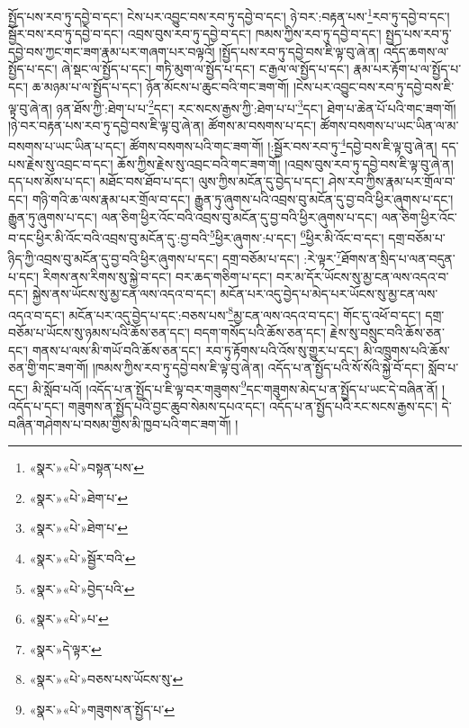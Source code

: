 སྤྱོད་པས་རབ་ཏུ་དབྱེ་བ་དང་། ངེས་པར་འབྱུང་བས་རབ་ཏུ་དབྱེ་བ་དང་། ཉེ་བར་:བརྟན་པས་\footnote{«སྣར་»«པེ་»བསྟན་པས་}རབ་ཏུ་དབྱེ་བ་དང་། སྦྱོར་བས་རབ་ཏུ་དབྱེ་བ་དང་། འབྲས་བུས་རབ་ཏུ་དབྱེ་བ་དང་། ཁམས་ཀྱིས་རབ་ཏུ་དབྱེ་བ་དང་། སྤྱད་པས་རབ་ཏུ་དབྱེ་བས་ཀྱང་གང་ཟག་རྣམ་པར་གཞག་པར་བལྟའོ། །སྤྱོད་པས་རབ་ཏུ་དབྱེ་བས་ཇི་ལྟ་བུ་ཞེ་ན། འདོད་ཆགས་ལ་སྤྱོད་པ་དང་། ཞེ་སྡང་ལ་སྤྱོད་པ་དང་། གཏི་མུག་ལ་སྤྱོད་པ་དང་། ང་རྒྱལ་ལ་སྤྱོད་པ་དང་། རྣམ་པར་རྟོག་པ་ལ་སྤྱོད་པ་དང་། ཆ་མཉམ་པ་ལ་སྤྱོད་པ་དང་། ཉོན་མོངས་པ་ཆུང་བའི་གང་ཟག་གོ། །ངེས་པར་འབྱུང་བས་རབ་ཏུ་དབྱེ་བས་ཇི་ལྟ་བུ་ཞེ་ན། ཉན་ཐོས་ཀྱི་:ཐེག་པ་པ་\footnote{«སྣར་»«པེ་»ཐེག་པ་}དང་། རང་སངས་རྒྱས་ཀྱི་:ཐེག་པ་པ་\footnote{«སྣར་»«པེ་»ཐེག་པ་}དང་། ཐེག་པ་ཆེན་པོ་པའི་གང་ཟག་གོ། །ཉེ་བར་བརྟན་པས་རབ་ཏུ་དབྱེ་བས་ཇི་ལྟ་བུ་ཞེ་ན། ཚོགས་མ་བསགས་པ་དང་། ཚོགས་བསགས་པ་ཡང་ཡིན་ལ་མ་བསགས་པ་ཡང་ཡིན་པ་དང་། ཚོགས་བསགས་པའི་གང་ཟག་གོ། །:སྦྱོར་བས་རབ་ཏུ་\footnote{«སྣར་»«པེ་»སྦྱོར་བའི་}དབྱེ་བས་ཇི་ལྟ་བུ་ཞེ་ན། དད་པས་རྗེས་སུ་འབྲང་བ་དང་། ཆོས་ཀྱིས་རྗེས་སུ་འབྲང་བའི་གང་ཟག་གོ། །འབྲས་བུས་རབ་ཏུ་དབྱེ་བས་ཇི་ལྟ་བུ་ཞེ་ན། དད་པས་མོས་པ་དང་། མཐོང་བས་ཐོབ་པ་དང་། ལུས་ཀྱིས་མངོན་དུ་བྱེད་པ་དང་། ཤེས་རབ་ཀྱིས་རྣམ་པར་གྲོལ་བ་དང་། གཉི་གའི་ཆ་ལས་རྣམ་པར་གྲོལ་བ་དང་། རྒྱུན་ཏུ་ཞུགས་པའི་འབྲས་བུ་མངོན་དུ་བྱ་བའི་ཕྱིར་ཞུགས་པ་དང་། རྒྱུན་ཏུ་ཞུགས་པ་དང་། ལན་ཅིག་ཕྱིར་འོང་བའི་འབྲས་བུ་མངོན་དུ་བྱ་བའི་ཕྱིར་ཞུགས་པ་དང་། ལན་ཅིག་ཕྱིར་འོང་བ་དང་ཕྱིར་མི་འོང་བའི་འབྲས་བུ་མངོན་དུ་:བྱ་བའི་\footnote{«སྣར་»«པེ་»བྱེད་པའི་}ཕྱིར་ཞུགས་:པ་དང་། \footnote{«སྣར་»«པེ་»པ་}ཕྱིར་མི་འོང་བ་དང་། དགྲ་བཅོམ་པ་ཉིད་ཀྱི་འབྲས་བུ་མངོན་དུ་བྱ་བའི་ཕྱིར་ཞུགས་པ་དང་། དགྲ་བཅོམ་པ་དང་། :རེ་ལྟར་\footnote{«སྣར་»དེ་ལྟར་}ཐོགས་ན་སྲིད་པ་ལན་བདུན་པ་དང་། རིགས་ནས་རིགས་སུ་སྐྱེ་བ་དང་། བར་ཆད་གཅིག་པ་དང་། བར་མ་དོར་ཡོངས་སུ་མྱ་ངན་ལས་འདའ་བ་དང་། སྐྱེས་ནས་ཡོངས་སུ་མྱ་ངན་ལས་འདའ་བ་དང་། མངོན་པར་འདུ་བྱེད་པ་མེད་པར་ཡོངས་སུ་མྱ་ངན་ལས་འདའ་བ་དང་། མངོན་པར་འདུ་བྱེད་པ་དང་:བཅས་པས་\footnote{«སྣར་»«པེ་»བཅས་པས་ཡོངས་སུ་}མྱ་ངན་ལས་འདའ་བ་དང་། གོང་དུ་འཕོ་བ་དང་། དགྲ་བཅོམ་པ་ཡོངས་སུ་ཉམས་པའི་ཆོས་ཅན་དང་། བདག་གསོད་པའི་ཆོས་ཅན་དང་། རྗེས་སུ་བསྲུང་བའི་ཆོས་ཅན་དང་། གནས་པ་ལས་མི་གཡོ་བའི་ཆོས་ཅན་དང་། རབ་ཏུ་རྟོགས་པའི་འོས་སུ་གྱུར་པ་དང་། མི་འཁྲུགས་པའི་ཆོས་ཅན་གྱི་གང་ཟག་གོ། །ཁམས་ཀྱིས་རབ་ཏུ་དབྱེ་བས་ཇི་ལྟ་བུ་ཞེ་ན། འདོད་པ་ན་སྤྱོད་པའི་སོ་སོའི་སྐྱེ་བོ་དང་། སློབ་པ་དང་། མི་སློབ་པའོ། །འདོད་པ་ན་སྤྱོད་པ་ཇི་ལྟ་བར་གཟུགས་\footnote{«སྣར་»«པེ་»གཟུགས་ན་སྤྱོད་པ་}དང་གཟུགས་མེད་པ་ན་སྤྱོད་པ་ཡང་དེ་བཞིན་ནོ། །འདོད་པ་དང་། གཟུགས་ན་སྤྱོད་པའི་བྱང་ཆུབ་སེམས་དཔའ་དང་། འདོད་པ་ན་སྤྱོད་པའི་རང་སངས་རྒྱས་དང་། དེ་བཞིན་གཤེགས་པ་བསམ་གྱིས་མི་ཁྱབ་པའི་གང་ཟག་གོ། །
